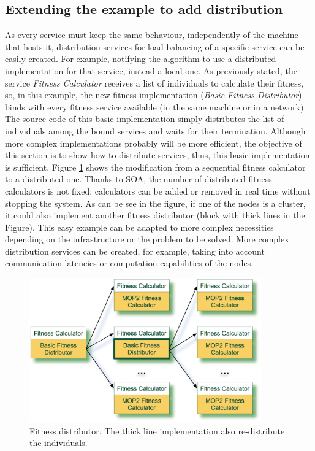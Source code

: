 \subsection{Extending the example to add distribution}
\label{sec:distribution}

As every service must keep the same behaviour, independently of the machine that hosts it, distribution services for load balancing of a specific service can be easily created. For example, notifying the algorithm to use a distributed implementation for that service, instead a local one. As previously stated, the service {\em Fitness Calculator} receives a list of individuals to calculate their fitness, so, in this example, the new fitness implementation ({\em Basic Fitness Distributor}) binds with every fitness service available (in the same machine or in a network). The source code of this basic implementation simply distributes the list of individuals among the bound services and waits for their termination. Although more complex implementations probably will be more efficient, the objective of this section is to show how to distribute services, thus, this basic implementation is sufficient. Figure \ref{FITNESSDISTRIBUTOR} shows the modification from a sequential fitness calculator to a distributed one. Thanks to SOA, the number of distributed fitness calculators is not fixed: calculators can be added or removed in real time without stopping the system. As can be see in the figure, if one of the nodes is a cluster, it could also  implement another fitness distributor (block with thick lines in the Figure). This easy example can be adapted to more complex necessities depending on the infrastructure or the problem to be solved. More complex distribution services can be created, for example, taking into account communication latencies or computation capabilities of the nodes.




\begin{figure}
\centering
\includegraphics[width=10cm]{gfx/soaea/distributor.jpg}
\caption{Fitness distributor. The thick line implementation also re-distribute the individuals.}
\label{FITNESSDISTRIBUTOR}
\end{figure}



